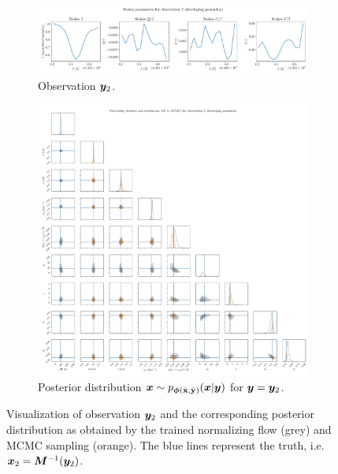 \documentclass[a4paper,12pt]{report}
\begin{document}
\begin{figure}[h!]
	\centering
	\begin{subfigure}[t]{\textwidth}
	\centering
	\includegraphics[width=\textwidth]{figures/nf-milne-eddington-example-6-corner-spectrum-2-nf-nflows-piecewisequadratic.pdf}
    \caption{Observation $\bm{y}_2$.}
	\end{subfigure}
	\begin{subfigure}[t]{\textwidth}
	\centering
	\includegraphics[width=\textwidth]{figures/nf-milne-eddington-example-6-corner-2-nf-mcmc-nflows-piecewisequadratic.pdf}
    \caption{Posterior distribution $\bm{x}\sim p_{\bm{\phi}(\hat{\boldsymbol{\mathbf{x}}},\hat{\boldsymbol{\mathbf{y}}})}(\bm{x}|\bm{y})$ for $\bm{y} = \bm{y}_2$.}
	\end{subfigure}
\cprotect\caption{Visualization of observation $\bm{y}_2$ and the corresponding posterior distribution as obtained by the trained normalizing flow (grey) and MCMC sampling (orange). The blue lines represent the truth, i.e. $\bm{x}_2 = \bm{M}^{-1}(\bm{y}_2)$.}
\label{fig:nf-milne-eddington-example-6-corner-2-nf-piecewisequadratic-results}
\end{figure}
\end{document}
